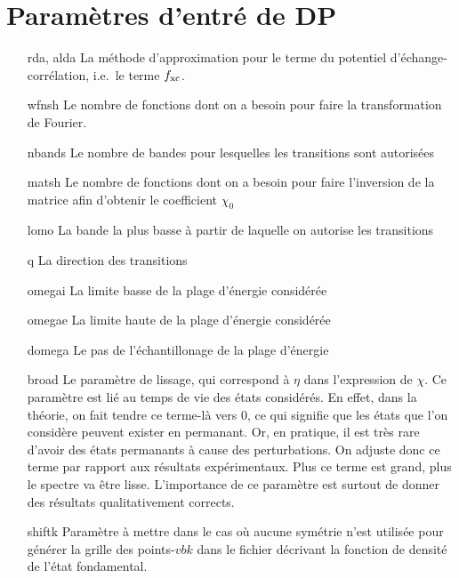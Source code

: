 \section{Paramètres d'entré de DP}
\begin{itemize}[labelwidth=, leftmargin=+, font=\bfseries]
  \item[rda, alda] La méthode d'approximation pour le terme du potentiel d'échange-corrélation, i.e.\ le terme $f_{\textnormal{xc}}$.
  \item[wfnsh] Le nombre de fonctions dont on a besoin pour faire la transformation de Fourier.
  \item[nbands] Le nombre de bandes pour lesquelles les transitions sont autorisées
  \item[matsh] Le nombre de fonctions dont on a besoin pour faire l'inversion de la matrice afin d'obtenir le coefficient $\chi_0$
  \item[lomo] La bande la plus basse à partir de laquelle on autorise les transitions
  \item[q] La direction des transitions
  \item[omegai] La limite basse de la plage d'énergie considérée
  \item[omegae] La limite haute de la plage d'énergie considérée
  \item[domega] Le pas de l'échantillonage de la plage d'énergie
  \item[broad] Le paramètre de lissage, qui correspond à $\eta$ dans l'expression de $\chi$.
    Ce paramètre est lié au temps de vie des états considérés.
    En effet, dans la théorie, on fait tendre ce terme-là vers 0,
    ce qui signifie que les états que l'on considère peuvent exister en permanant.
    Or, en pratique, il est très rare d'avoir des états permanants à cause des perturbations.
    On adjuste donc ce terme par rapport aux résultats expérimentaux.
    Plus ce terme est grand, plus le spectre va être lisse.
    L'importance de ce paramètre est surtout de donner des résultats qualitativement corrects.
  \item[shiftk] Paramètre à mettre dans le cas où aucune symétrie n'est utilisée pour générer
    la grille des points-$vb{k}$ dans le fichier décrivant la fonction de densité de l'état fondamental.
\end{itemize}
